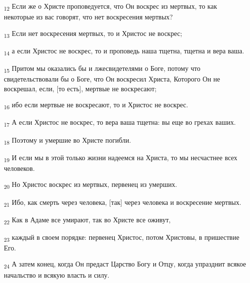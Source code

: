 \begin{tcolorbox}
\textsubscript{12} Если же о Христе проповедуется, что Он воскрес из мертвых, то как некоторые из вас говорят, что нет воскресения мертвых?
\end{tcolorbox}
\begin{tcolorbox}
\textsubscript{13} Если нет воскресения мертвых, то и Христос не воскрес;
\end{tcolorbox}
\begin{tcolorbox}
\textsubscript{14} а если Христос не воскрес, то и проповедь наша тщетна, тщетна и вера ваша.
\end{tcolorbox}
\begin{tcolorbox}
\textsubscript{15} Притом мы оказались бы и лжесвидетелями о Боге, потому что свидетельствовали бы о Боге, что Он воскресил Христа, Которого Он не воскрешал, если, [то есть], мертвые не воскресают;
\end{tcolorbox}
\begin{tcolorbox}
\textsubscript{16} ибо если мертвые не воскресают, то и Христос не воскрес.
\end{tcolorbox}
\begin{tcolorbox}
\textsubscript{17} А если Христос не воскрес, то вера ваша тщетна: вы еще во грехах ваших.
\end{tcolorbox}
\begin{tcolorbox}
\textsubscript{18} Поэтому и умершие во Христе погибли.
\end{tcolorbox}
\begin{tcolorbox}
\textsubscript{19} И если мы в этой только жизни надеемся на Христа, то мы несчастнее всех человеков.
\end{tcolorbox}
\begin{tcolorbox}
\textsubscript{20} Но Христос воскрес из мертвых, первенец из умерших.
\end{tcolorbox}
\begin{tcolorbox}
\textsubscript{21} Ибо, как смерть через человека, [так] через человека и воскресение мертвых.
\end{tcolorbox}
\begin{tcolorbox}
\textsubscript{22} Как в Адаме все умирают, так во Христе все оживут,
\end{tcolorbox}
\begin{tcolorbox}
\textsubscript{23} каждый в своем порядке: первенец Христос, потом Христовы, в пришествие Его.
\end{tcolorbox}
\begin{tcolorbox}
\textsubscript{24} А затем конец, когда Он предаст Царство Богу и Отцу, когда упразднит всякое начальство и всякую власть и силу.
\end{tcolorbox}
